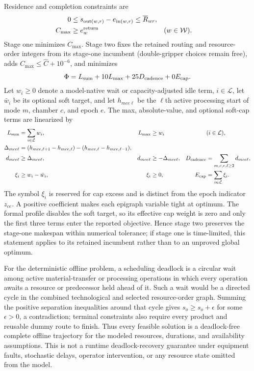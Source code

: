 \documentclass[11pt]{article}
\begin{document}
Residence and completion constraints are
\begin{align}
0&\le s_{\operatorname{out}(w,r)}
-e_{\operatorname{in}(w,r)}\le\overline R_{wr},\\
C_{\max}&\ge e_w^{\rm return} &&(w\in\mathcal W).
\end{align}
Stage one minimizes $C_{\max}$. Stage two fixes the retained routing and
resource-order integers from its stage-one incumbent (double-gripper choices
remain free), adds $C_{\max}\le\widehat C+10^{-6}$, and minimizes
\begin{equation}
\Phi=L_{\rm sum}+10L_{\max}+25D_{\rm cadence}+0E_{\rm cap}.
\end{equation}
Let $w_i\ge0$ denote a model-native wait or capacity-adjusted idle term,
$i\in\mathcal L$, let $\bar{w}_i$ be its optional soft target, and let
$h_{mce\ell}$ be the $\ell$th active processing start of mode $m$, chamber
$c$, and epoch $e$. The max, absolute-value, and optional soft-cap terms are
linearized by
\begin{align}
L_{\rm sum}&=\sum_{i\in\mathcal L}w_i,&
L_{\max}&\ge w_i &&(i\in\mathcal L),\\
\Delta_{mce\ell}&=(h_{mce,\ell+1}-h_{mce,\ell})
 -(h_{mce,\ell}-h_{mce,\ell-1}),\\
d_{mce\ell}&\ge \Delta_{mce\ell},&
d_{mce\ell}&\ge-\Delta_{mce\ell},&
D_{\rm cadence}&=\sum_{m,c,e,\ell\ge2}d_{mce\ell},\\
\xi_i&\ge w_i-\bar{w}_i,&
\xi_i&\ge0,&
E_{\rm cap}&=\sum_{i\in\mathcal L}\xi_i.
\end{align}
The symbol $\xi_i$ is reserved for cap excess and is distinct from the epoch
indicator $z_{ce}$. A positive coefficient makes each epigraph variable tight
at optimum. The formal profile disables the soft target, so its effective cap
weight is zero and only the first three terms enter the reported objective.
Hence stage two preserves the stage-one
makespan within numerical tolerance; if stage one is time-limited, this
statement applies to its retained incumbent rather than to an unproved global
optimum.

For the deterministic offline problem, a scheduling deadlock is a circular
wait among active material-transfer or processing operations in which every
operation awaits a resource or predecessor held ahead of it. Such a wait would
be a directed cycle in the combined technological and selected resource-order
graph. Summing the positive separation inequalities around that cycle gives
$s_o\ge s_o+\epsilon$ for some $\epsilon>0$, a contradiction; terminal
constraints also require every product and reusable dummy route to finish.
Thus every feasible solution is a deadlock-free complete offline trajectory
for the modeled resources, durations, and availability assumptions. This is
not a runtime deadlock-recovery guarantee under equipment faults, stochastic
delays, operator intervention, or any resource state omitted from the model.
\end{document}
